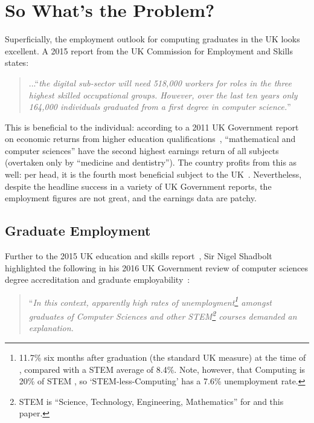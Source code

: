 \documentclass[sigconf,anonymous]{acmart}
\begin{document}
\section{So What's the Problem?}\label{problem}

Superficially, the employment outlook for computing graduates in the
UK looks excellent. A 2015 report from the UK Commission for
Employment and Skills~\cite[p.~74]{UKCES2015b} states:

\begin{quote} ...``{\emph{the digital sub-sector will need 518,000 workers for
roles in the three highest skilled occupational groups. However, over
the last ten years only 164,000 individuals graduated from a first
degree in computer science.}}''
\end{quote} 

This is beneficial to the individual: according to a 2011 UK
Government report on economic returns from higher education
qualifications~\cite[Figure 4]{BIS2011a}, ``mathematical and
computer sciences'' have the second highest earnings return of all
subjects (overtaken only by ``medicine and dentistry'').  The country
profits from this as well: per head, it is the fourth most beneficial
subject to the UK~\cite[p.~16]{BIS2011a}. Nevertheless, despite the
headline success in a variety of UK Government reports, the employment
figures are not great, and the earnings data are patchy.

\subsection{Graduate Employment}

Further to the 2015 UK education and skills report~\cite{UKCES2015b},
Sir Nigel Shadbolt highlighted the following in his 2016 UK Government
review of
computer sciences degree accreditation and graduate
employability~\cite{Shadbolt2016a}:

\begin{quote} ``{\emph{In this context, apparently high rates of
unemployment\footnote{11.7\% six months after graduation (the standard
UK measure) at the time of \cite{Shadbolt2016a}, compared with a STEM
average of 8.4\%. Note, however, that Computing is 20\% of STEM
\cite[Table 1]{Wakeham2016a}, so `STEM-less-Computing' has a 7.6\%
unemployment rate.} amongst graduates of Computer Sciences and other
STEM\footnote{STEM is ``Science, Technology, Engineering,
Mathematics'' for \cite{Shadbolt2016a} and this paper.} courses
demanded an explanation.}}
\end{quote}
\end{document}
